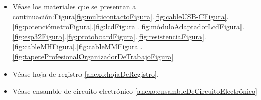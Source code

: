 \begin{itemize}
        \item Véase los materiales que se presentan a continuación:Figura\ref{fig:multicontactoFigura}.\ref{fig:cableUSB-CFigura}.\ref{fig:potenciómetroFigura}.\ref{fig:lcdFigura}.\ref{fig:móduloAdaptadorLcdFigura}.\ref{fig:esp32Figura}.\ref{fig:protoboardFigura}.\ref{fig:resistenciaFigura}.\ref{fig:cableMHFigura}.\ref{fig:cableMMFigura}.\ref{fig:tapeteProfesionalOrganizadorDeTrabajoFigura}
        \item Véase hoja de registro \ref{anexo:hojaDeRegistro}.
        \item Véase ensamble de circuito electrónico \ref{anexo:ensambleDeCircuitoElectrónico}
    \end{itemize}
